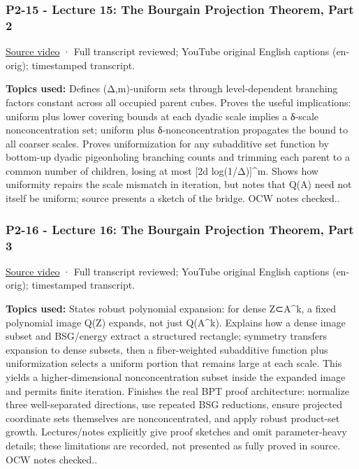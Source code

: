 \subsubsection{P2-15 - Lecture 15: The Bourgain Projection Theorem, Part 2}\label{04-visual-computing-ii-ch036-p2-15---lecture-15-the-bourgain-projection-theorem-part-2}

\hypertarget{04-visual-computing-ii-ch036-p2-15---lecture-15-the-bourgain-projection-theorem-part-2}{}

\href{https://www.youtube.com/watch?v=1lql9PGvLG4}{Source video} · Full transcript reviewed; YouTube original English captions (en-orig); timestamped transcript.

\textbf{Topics used:} Defines (Δ,m)-uniform sets through level-dependent branching factors constant across all occupied parent cubes. Proves the useful implications: uniform plus lower covering bounds at each dyadic scale implies a δ-scale nonconcentration set; uniform plus δ-nonconcentration propagates the bound to all coarser scales. Proves uniformization for any subadditive set function by bottom-up dyadic pigeonholing branching counts and trimming each parent to a common number of children, losing at most {[}2d log(1/Δ){]}\^{}m. Shows how uniformity repairs the scale mismatch in iteration, but notes that Q(A) need not itself be uniform; source presents a sketch of the bridge. OCW notes checked..

\subsubsection{P2-16 - Lecture 16: The Bourgain Projection Theorem, Part 3}\label{04-visual-computing-ii-ch036-p2-16---lecture-16-the-bourgain-projection-theorem-part-3}

\hypertarget{04-visual-computing-ii-ch036-p2-16---lecture-16-the-bourgain-projection-theorem-part-3}{}

\href{https://www.youtube.com/watch?v=85YISwhp7MQ}{Source video} · Full transcript reviewed; YouTube original English captions (en-orig); timestamped transcript.

\textbf{Topics used:} States robust polynomial expansion: for dense Z⊂A\^{}k, a fixed polynomial image Q(Z) expands, not just Q(A\^{}k). Explains how a dense image subset and BSG/energy extract a structured rectangle; symmetry transfers expansion to dense subsets, then a fiber-weighted subadditive function plus uniformization selects a uniform portion that remains large at each scale. This yields a higher-dimensional nonconcentration subset inside the expanded image and permits finite iteration. Finishes the real BPT proof architecture: normalize three well-separated directions, use repeated BSG reductions, ensure projected coordinate sets themselves are nonconcentrated, and apply robust product-set growth. Lectures/notes explicitly give proof sketches and omit parameter-heavy details; these limitations are recorded, not presented as fully proved in source. OCW notes checked..

